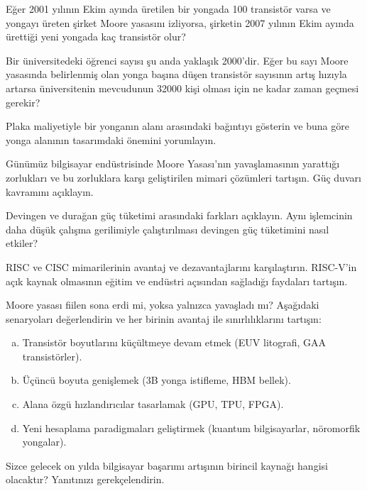 \begin{alistirma}[\orta]
Eğer 2001 yılının Ekim ayında üretilen bir yongada 100 transistör varsa ve yongayı üreten şirket Moore yasasını izliyorsa, şirketin 2007 yılının Ekim ayında ürettiği yeni yongada kaç transistör olur?
\end{alistirma}

\begin{alistirma}[\orta]
Bir üniversitedeki öğrenci sayısı şu anda yaklaşık 2000'dir. Eğer bu sayı Moore yasasında belirlenmiş olan yonga başına düşen transistör sayısının artış hızıyla artarsa üniversitenin mevcudunun 32000 kişi olması için ne kadar zaman geçmesi gerekir?
\end{alistirma}

\begin{alistirma}[\orta]
Plaka maliyetiyle bir yonganın alanı arasındaki bağıntıyı gösterin ve buna göre yonga alanının tasarımdaki önemini yorumlayın.
\end{alistirma}

\begin{alistirma}[\zor]
Günümüz bilgisayar endüstrisinde Moore Yasası'nın yavaşlamasının yarattığı zorlukları ve bu zorluklara karşı geliştirilen mimari çözümleri tartışın. Güç duvarı kavramını açıklayın.
\end{alistirma}

\begin{alistirma}[\orta]
Devingen ve durağan güç tüketimi arasındaki farkları açıklayın. Aynı işlemcinin daha düşük çalışma gerilimiyle çalıştırılması devingen güç tüketimini nasıl etkiler?
\end{alistirma}

\begin{alistirma}[\zor]
RISC ve CISC mimarilerinin avantaj ve dezavantajlarını karşılaştırın. RISC-V'in açık kaynak olmasının eğitim ve endüstri açısından sağladığı faydaları tartışın.
\end{alistirma}

\begin{alistirma}[\zor]
Moore yasası fiilen sona erdi mi, yoksa yalnızca yavaşladı mı? Aşağıdaki senaryoları değerlendirin ve her birinin avantaj ile sınırlılıklarını tartışın:
\begin{enumerate}[(a)]
    \item Transistör boyutlarını küçültmeye devam etmek (EUV litografi, GAA transistörler).
    \item Üçüncü boyuta genişlemek (3B yonga istifleme, HBM bellek).
    \item Alana özgü hızlandırıcılar tasarlamak (GPU, TPU, FPGA).
    \item Yeni hesaplama paradigmaları geliştirmek (kuantum bilgisayarlar, nöromorfik yongalar).
\end{enumerate}
Sizce gelecek on yılda bilgisayar başarımı artışının birincil kaynağı hangisi olacaktır? Yanıtınızı gerekçelendirin.
\end{alistirma}


